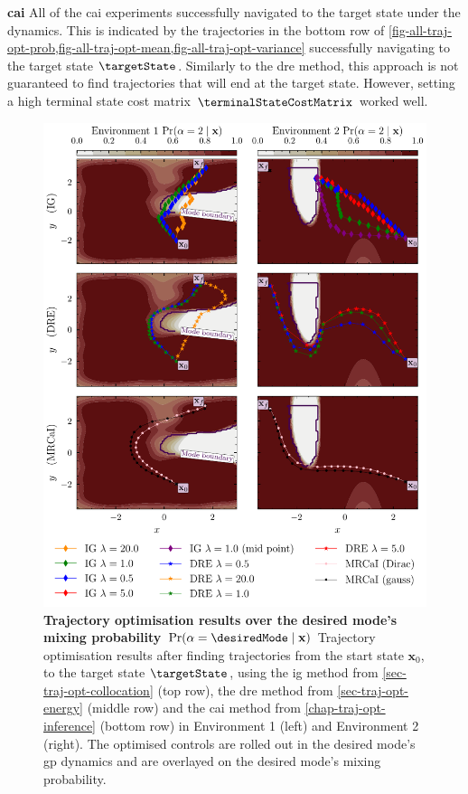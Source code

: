 \documentclass{mimosis-class/mimosis}
\numberwithin{equation}{chapter}
\newcommand{\state}{\ensuremath{\mathbf{x}}}
\newcommand{\modeVar}{\ensuremath{\alpha}}
\begin{document}
{\textbf{\acrfull{cai}}
All of the \acrshort{cai} experiments successfully navigated to the target state under the dynamics.
This is indicated by the trajectories in
the bottom row of \cref{fig-all-traj-opt-prob,fig-all-traj-opt-mean,fig-all-traj-opt-variance}
successfully navigating to the target state \(\targetState\).
Similarly to the \acrshort{dre} method, this approach is not guaranteed
to find trajectories that will end at the target state.
However, setting a high terminal state cost matrix \(\terminalStateCostMatrix\) worked well.

\begin{figure}
\centering
\includegraphics[width=\textwidth]{./images/mode-opt/trajectory_optimisation/all_trajectories_over_prob_both_scenarios.pdf}
\caption[Trajectory optimisation results over desired mode's mixing probability]{\textbf{Trajectory optimisation results over the desired mode's mixing probability  $\Pr(\modeVar=\desiredMode \mid \state)$}
Trajectory optimisation results after finding trajectories from the start state $\state_0$,
to the target state $\targetState$, using the \acrfull{ig} method
from \cref{sec-traj-opt-collocation}
(top row), the \acrfull{dre} method from \cref{sec-traj-opt-energy} (middle row) and the
\acrfull{cai} method from \cref{chap-traj-opt-inference} (bottom row) in Environment 1 (left)
and Environment 2 (right).
The optimised controls are rolled out in the desired mode's \acrshort{gp} dynamics and are overlayed on the
desired mode's mixing probability.}
\label{fig-all-traj-opt-prob}
\end{figure}

}
\end{document}
